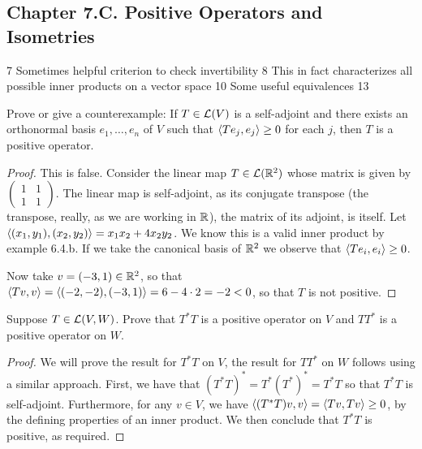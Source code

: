 \subsection*{Chapter 7.C. Positive Operators and Isometries}


7 Sometimes helpful criterion to check invertibility
8 This in fact characterizes all possible inner products on a vector space
10 Some useful equivalences
13 

\begin{exercise}{1}
  Prove or give a counterexample: If $T\in\mathcal{L}(V)$ is a self-adjoint and there exists an orthonormal basis $e_1,\dots,e_n$ of $V$ such that $\langle Te_j,e_j\rangle\geq 0$ for each $j$, then $T$ is a positive operator.
\end{exercise}
\begin{proof}
 This is false. Consider the linear map $T\in\mathcal{L}(\mathbb{R}^2)$ whose matrix is given by
 $\begin{pmatrix}
     1 & 1\\
     1 & 1
 \end{pmatrix}$.
 The linear map is self-adjoint, as its conjugate transpose (the transpose, really, as we are working in $\mathbb{R}$), the matrix of its adjoint, is itself. Let $\langle (x_1,y_1),(x_2,y_2)\rangle=x_1x_2+4x_2y_2$. We know this is a valid inner product by example 6.4.b. If we take the canonical basis of $\mathbb{R}^2$ we observe that $\langle Te_i,e_i\rangle\geq 0$. 

 Now take $v=(-3,1)\in\mathbb{R}^2$, so that $\langle Tv,v\rangle =\langle (-2,-2),(-3,1)\rangle =6-4\cdot 2 =-2<0$, so that $T$ is not positive.
\end{proof}

\begin{exercise}{4}
  Suppose $T\in\mathcal{L}(V,W)$. Prove that $T^\ast T$ is a positive operator on $V$ and $TT^\ast$ is a positive operator on $W$.
\end{exercise}
\begin{proof}
 We will prove the result for $T^\ast T$ on $V$, the result for $TT^\ast$ on $W$ follows using a similar approach. First, we have that $(T^\ast T)^\ast =T^\ast (T^\ast)^\ast = T^\ast T$ so that $T^\ast T$ is self-adjoint. Furthermore, for any $v\in V$, we have $\langle (T^\ast T)v,v\rangle =\langle Tv,Tv\rangle\geq 0$, by the defining properties of an inner product. We then conclude that $T^\ast T$ is positive, as required.
\end{proof}

